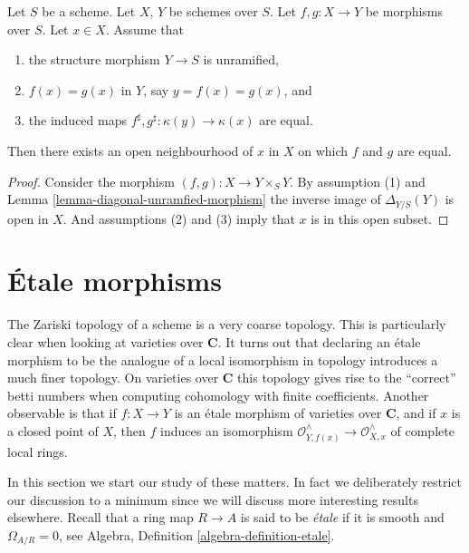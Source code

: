 \begin{lemma}
\label{lemma-value-at-one-point}
Let $S$ be a scheme.
Let $X$, $Y$ be schemes over $S$.
Let $f, g : X \to Y$ be morphisms over $S$. Let $x \in X$.
Assume that
\begin{enumerate}
\item the structure morphism $Y \to S$ is unramified,
\item $f(x) = g(x)$ in $Y$, say $y = f(x) = g(x)$, and
\item the induced maps $f^\sharp, g^\sharp : \kappa(y) \to \kappa(x)$
are equal.
\end{enumerate}
Then there exists an open neighbourhood of $x$ in $X$ on which
$f$ and $g$ are equal.
\end{lemma}

\begin{proof}
Consider the morphism $(f, g) : X \to Y \times_S Y$. By assumption (1) and
Lemma \ref{lemma-diagonal-unramfied-morphism}
the inverse image of $\Delta_{Y/S}(Y)$ is open in $X$.
And assumptions (2) and (3) imply that $x$ is in this open subset.
\end{proof}










\section{\'Etale morphisms}
\label{section-etale}

\noindent
The Zariski topology of a scheme is a very coarse topology.
This is particularly clear when looking at varieties over $\mathbf{C}$.
It turns out that declaring an \'etale morphism to be the analogue of a
local isomorphism in topology introduces a much finer topology. On
varieties over $\mathbf{C}$ this topology gives rise to the ``correct'' betti
numbers when computing cohomology with finite coefficients. Another
observable is that if $f : X \to Y$ is an \'etale morphism of varieties over
$\mathbf{C}$, and if $x$ is a closed point of $X$, then 
$f$ induces an isomorphism
$\mathcal{O}^{\wedge}_{Y, f(x)} \to \mathcal{O}^{\wedge}_{X, x}$
of complete local rings.

\medskip\noindent
In this section we start our study of these matters. In fact we deliberately
restrict our discussion to a minimum since we will discuss more interesting
results elsewhere. Recall that a ring map $R \to A$ is said to be {\it \'etale}
if it is smooth and $\Omega_{A/R} = 0$, see
Algebra, Definition \ref{algebra-definition-etale}.

